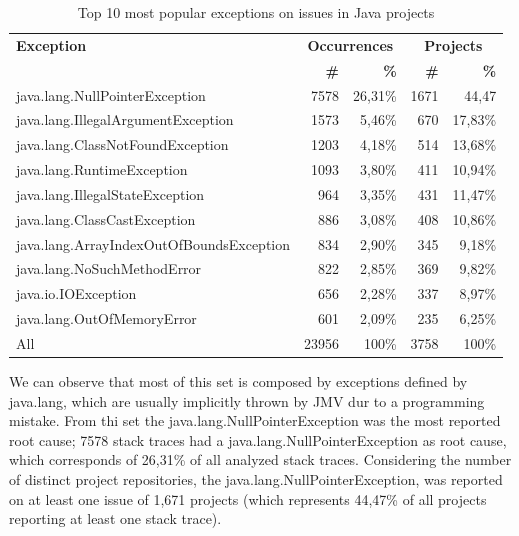 \documentclass[conference]{IEEEtran}
\begin{document}
\begin{table}
\begin{tabular}{lrrrr}
    \hline
    \bfseries{Exception} &  \multicolumn{2}{c}{\bfseries{Occurrences}} &  \multicolumn{2}{c}{\bfseries{Projects}}\\
    & \bfseries{\#} &  \bfseries{\%} & \bfseries{\# } & \bfseries{\% } \\
    \hline
java.lang.NullPointerException             & 7578 & 26,31\% & 1671 & 44,47 \\
java.lang.IllegalArgumentException         & 1573 & 5,46\%  & 670  & 17,83\% \\
java.lang.ClassNotFoundException           & 1203 & 4,18\%  & 514  & 13,68\% \\
java.lang.RuntimeException                 & 1093 & 3,80\%  & 411  & 10,94\% \\
java.lang.IllegalStateException            & 964  & 3,35\%  & 431  & 11,47\% \\
java.lang.ClassCastException               & 886  & 3,08\%  & 408  & 10,86\% \\
java.lang.ArrayIndexOutOfBoundsException   & 834  & 2,90\%  & 345  & 9,18\% \\
java.lang.NoSuchMethodError                & 822  & 2,85\%  & 369  & 9,82\% \\
java.io.IOException                        & 656  & 2,28\%  & 337  & 8,97\% \\
java.lang.OutOfMemoryError                 & 601  & 2,09\%  & 235  & 6,25\% \\
\hline
All	 &	23956 &	100\%	& 3758 & 100\%	 \\
\hline
  \end{tabular}
\caption{Top 10 most popular exceptions on issues in Java projects}
\label{tab:toptenjava}
\end{table}




We can observe that most of this set is composed by exceptions defined by java.lang,
which are usually implicitly thrown by JMV dur to a programming mistake. From thi set
the java.lang.NullPointerException  was the most reported root cause;  7578 stack traces 
had a java.lang.NullPointerException  as root cause, which corresponds of 26,31\%  of 
all analyzed stack traces. Considering the number of distinct project repositories, 
the java.lang.NullPointerException, was reported on at least one issue of 1,671 projects 
(which represents 44,47\% of all projects reporting at least one stack trace).
\end{document}
